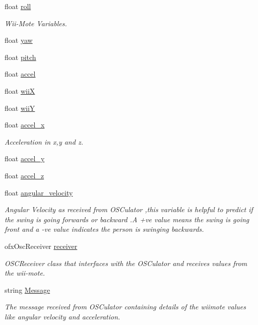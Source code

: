 \begin{DoxyCompactItemize}
float \hyperlink{classtest_app_a020730abb55e6ae6d0a28edee19050e0}{roll}
\begin{DoxyCompactList}\small\item\em Wii-\/\-Mote Variables. \end{DoxyCompactList}\item 
float \hyperlink{classtest_app_a865985f78dd5def3ed20c87b9fc772b6}{yaw}
\item 
float \hyperlink{classtest_app_aabbebeb113838374f659e86a0355b260}{pitch}
\item 
float \hyperlink{classtest_app_a8e560e923c82d421857538e4a5927542}{accel}
\item 
float \hyperlink{classtest_app_a7a77e8633c3a94e3e409a33a5cd9ae3f}{wii\-X}
\item 
float \hyperlink{classtest_app_a5ae41896388ae16ee530beca5333e02a}{wii\-Y}
\item 
float \hyperlink{classtest_app_ad1738ff98d225f80b853a9ddc9f5a116}{accel\-\_\-x}
\begin{DoxyCompactList}\small\item\em Acceleration in x,y and z. \end{DoxyCompactList}\item 
float \hyperlink{classtest_app_a204bcb2412a70a65ebea6008ee8c4eb0}{accel\-\_\-y}
\item 
float \hyperlink{classtest_app_a61dbdd5c0b868568dde40a52f6e56054}{accel\-\_\-z}
\item 
float \hyperlink{classtest_app_a98e05c3206ff95fccfebfc9df5317598}{angular\-\_\-velocity}
\begin{DoxyCompactList}\small\item\em Angular Velocity as received from O\-S\-Culator ,this variable is helpful to predict if the swing is going forwards or backward .A +ve value means the swing is going front and a -\/ve value indicates the person is swinging backwards. \end{DoxyCompactList}\item 
ofx\-Osc\-Receiver \hyperlink{classtest_app_a034c44ff60fa1e5f021e90d5410ba657}{receiver}
\begin{DoxyCompactList}\small\item\em O\-S\-C\-Receiver class that interfaces with the O\-S\-Culator and receives values from the wii-\/mote. \end{DoxyCompactList}\item 
string \hyperlink{classtest_app_a0124035d0454fb6bd9152f8a87c40677}{Message}
\begin{DoxyCompactList}\small\item\em The message received from O\-S\-Culator containing details of the wiimote values like angular velocity and acceleration. \end{DoxyCompactList}\item 

\end{DoxyCompactItemize}
